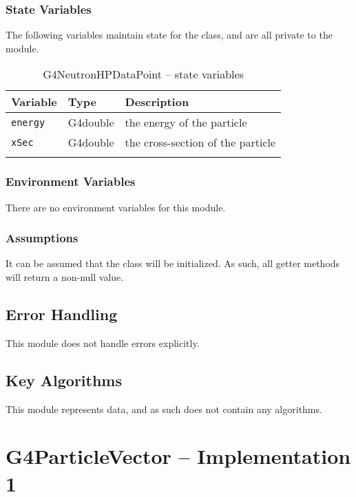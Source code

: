 \documentclass[12pt]{article}
\begin{document}
\subsubsection{State Variables}%
The following variables maintain state for the class, and are all private to the module.

\begin{table}[h]
\caption{G4NeutronHPDataPoint -- state variables}\label{Table_NeutronHPDataPointStateVariables}
\begin{tabularx}{\textwidth}{llX}
\toprule
\bf Variable & \bf Type & \bf Description\\\midrule
\arrayrulecolor{lightgray}
\texttt{energy} & G4double & the energy of the particle \\\hline
\texttt{xSec}   & G4double & the cross-section of the particle \\
\arrayrulecolor{black}
\bottomrule
\end{tabularx}
\end{table}

\subsubsection{Environment Variables}%
There are no environment variables for this module.

\subsubsection{Assumptions}%
It can be assumed that the class will be initialized. As such, all getter methods will return a non-null value.

\subsection{Error Handling}
This module does not handle errors explicitly.

\subsection{Key Algorithms}
This module represents data, and as such does not contain any algorithms.



\section{G4ParticleVector -- Implementation 1}
\end{document}
